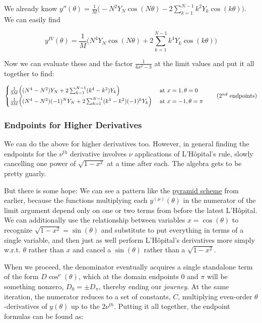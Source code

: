 \documentclass[10pt]{article}
\begin{document}
We already know $y''(\theta) = \frac{1}{M} \Big(-N^2 Y_N \cos(N\theta) - 2 \sum_{k=1}^{N-1} k^2 Y_k \cos(k\theta) \Big)$. We can easily find

$$y^{IV}(\theta) = \frac{1}{M} \Big(N^4 Y_N \cos(N\theta) + 2 \sum_{k=1}^{N-1} k^4 Y_k \cos(k\theta) \Big)$$

Now we can evaluate these and the factor $\frac{1}{6x^2 - 3}$ at the limit values and put it all together to find: 

\[
\begin{cases} \frac{1}{3M} \Big((N^4 - N^2) Y_N + 2 \sum_{k=1}^{N-1} (k^4 - k^2) Y_k \Big) & \text{ at } x=1, \theta=0 \\ \frac{1}{3M} \Big((N^4 - N^2)(-1)^N Y_N + 2 \sum_{k=1}^{N-1} (k^4 - k^2) (-1)^k Y_k \Big) & \text{ at } x=-1, \theta=\pi \end{cases} \tag{$2^{nd}$ endpoints}
\]\vspace{2mm}

\subsubsection{Endpoints for Higher Derivatives}

We can do the above for higher derivatives too. However, in general finding the endpoints for the $\nu^{th}$ derivative involves $\nu$ applications of L'Hôpital's rule, slowly cancelling one power of $\sqrt{1-x^2}$ at a time after each. The algebra gets to be pretty gnarly.

But there is some hope: We can see a pattern like the \hyperref[pyramid]{pyramid scheme} from earlier, because the functions multiplying each $y^{(\mu)}(\theta)$ in the numerator of the limit argument depend only on one or two terms from before the latest L'Hôpital. We can additionally use the relationship between variables $x = \cos(\theta)$ to recognize $\sqrt{1-x^2} = \sin(\theta)$ and substitute to put everything in terms of a single variable, and then just as well perform L'Hôpital's derivatives more simply w.r.t. $\theta$ rather than $x$ and cancel a $\sin(\theta)$ rather than a $\sqrt{1-x^2}$.

When we proceed, the denominator eventually acquires a single standalone term of the form $D\cos^\nu(\theta)$, which at the domain endpoints $0$ and $\pi$ will be something nonzero, $D_0 = \pm D_\pi$, thereby ending our \textit{journey}. At the same iteration, the numerator reduces to a set of constants, $C$, multiplying even-order $\theta$-derivatives of $y(\theta)$ up to the $2\nu^{th}$. Putting it all together, the endpoint formulas can be found as:
\end{document}
